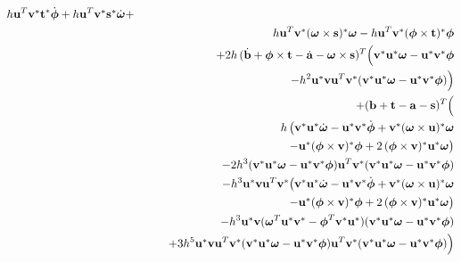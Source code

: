 \begin{eqnarray}
        h\ve{u}^T\dual{\ve{v}}\dual{\ve{t}}\dot{\ve{\phi}} +
        h\ve{u}^T\dual{\ve{v}}\dual{\ve{s}}\dot{\ve{\omega}} + \nonumber\\*&&
        h\ve{u}^T\dual{\ve{v}}\dual{(\ve{\omega}\times\ve{s})}\ve{\omega} -
        h\ve{u}^T\dual{\ve{v}}\dual{(\ve{\phi}\times\ve{t})}\ve{\phi} \nonumber\\*&&
        +2h\,(\dot{\ve{b}} + \ve{\phi}\times\ve{t} - \dot{\ve{a}} - \ve{\omega}\times\ve{s})^T
        \Big(\dual{\ve{v}}\dual{\ve{u}}\ve{\omega} - \dual{\ve{u}}\dual{\ve{v}}\ve{\phi}
        \nonumber\\*&&\quad\quad -h^2\dual{\ve{u}}\ve{v}\ve{u}^T\dual{\ve{v}}
        (\dual{\ve{v}}\dual{\ve{u}}\ve{\omega} - \dual{\ve{u}}\dual{\ve{v}}\ve{\phi})\Big)
        \nonumber\\*&& +(\ve{b} + \ve{t} - \ve{a} - \ve{s})^T \Big(
        \nonumber\\*&&\quad\quad h\,\big(
        \dual{\ve{v}}\dual{\ve{u}}\dot{\ve{\omega}} - \dual{\ve{u}}\dual{\ve{v}}\dot{\ve{\phi}} +
        \dual{\ve{v}}\dual{(\ve{\omega}\times\ve{u})}\ve{\omega} \nonumber\\*&&\quad\quad\quad\quad
        -\dual{\ve{u}}\dual{(\ve{\phi}\times\ve{v})}\ve{\phi} +
        2\,\dual{(\ve{\phi}\times\ve{v})}\dual{\ve{u}}\ve{\omega} \big)
        \nonumber\\*&&\quad\quad
        -2h^3 (\dual{\ve{v}}\dual{\ve{u}}\ve{\omega} - \dual{\ve{u}}\dual{\ve{v}}\ve{\phi})
        \ve{u}^T\dual{\ve{v}}
        (\dual{\ve{v}}\dual{\ve{u}}\ve{\omega} - \dual{\ve{u}}\dual{\ve{v}}\ve{\phi})
        \nonumber\\*&&\quad\quad
        -h^3\dual{\ve{u}}\ve{v}\ve{u}^T\dual{\ve{v}} \big(
        \dual{\ve{v}}\dual{\ve{u}}\dot{\ve{\omega}} - \dual{\ve{u}}\dual{\ve{v}}\dot{\ve{\phi}} +
        \dual{\ve{v}}\dual{(\ve{\omega}\times\ve{u})}\ve{\omega} \nonumber\\*&&\quad\quad\quad\quad
        -\dual{\ve{u}}\dual{(\ve{\phi}\times\ve{v})}\ve{\phi} +
        2\,\dual{(\ve{\phi}\times\ve{v})}\dual{\ve{u}}\ve{\omega} \big)
        \nonumber\\*&&\quad\quad
        -h^3 \dual{\ve{u}}\ve{v}
        (\ve{\omega}^T\dual{\ve{u}}\dual{\ve{v}} - \ve{\phi}^T\dual{\ve{v}}\dual{\ve{u}})
        (\dual{\ve{v}}\dual{\ve{u}}\ve{\omega} - \dual{\ve{u}}\dual{\ve{v}}\ve{\phi})
        \nonumber\\*&&\quad\quad
        +3h^5 \dual{\ve{u}}\ve{v} \ve{u}^T\dual{\ve{v}}
        (\dual{\ve{v}}\dual{\ve{u}}\ve{\omega} - \dual{\ve{u}}\dual{\ve{v}}\ve{\phi})
        \ve{u}^T\dual{\ve{v}}
        (\dual{\ve{v}}\dual{\ve{u}}\ve{\omega} - \dual{\ve{u}}\dual{\ve{v}}\ve{\phi}) \Big) \nonumber
\end{eqnarray}

